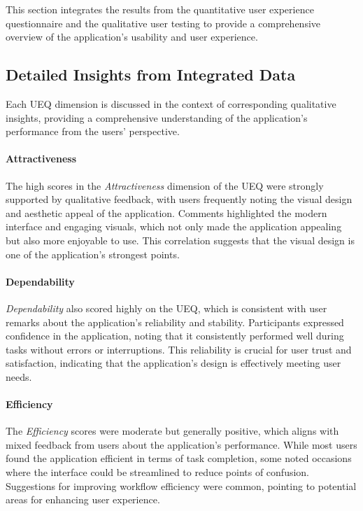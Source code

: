 This section integrates the results from the quantitative user experience questionnaire and the qualitative user testing to provide a comprehensive overview of the application's usability and user experience.

\subsection*{Detailed Insights from Integrated Data}
\label{subsec:findings:detailed_insights}
Each UEQ dimension is discussed in the context of corresponding qualitative insights, providing a comprehensive understanding of the application’s performance from the users' perspective.

\paragraph{Attractiveness}
The high scores in the \emph{Attractiveness} dimension of the UEQ were strongly supported by qualitative feedback, with users frequently noting the visual design and aesthetic appeal of the application. 
Comments highlighted the modern interface and engaging visuals, which not only made the application appealing but also more enjoyable to use. 
This correlation suggests that the visual design is one of the application's strongest points.

\paragraph{Dependability}
\emph{Dependability} also scored highly on the UEQ, which is consistent with user remarks about the application’s reliability and stability.
Participants expressed confidence in the application, noting that it consistently performed well during tasks without errors or interruptions. 
This reliability is crucial for user trust and satisfaction, indicating that the application’s design is effectively meeting user needs.

\paragraph{Efficiency}
The \emph{Efficiency} scores were moderate but generally positive, which aligns with mixed feedback from users about the application's performance. 
While most users found the application efficient in terms of task completion, some noted occasions where the interface could be streamlined to reduce points of confusion.
Suggestions for improving workflow efficiency were common, pointing to potential areas for enhancing user experience.

